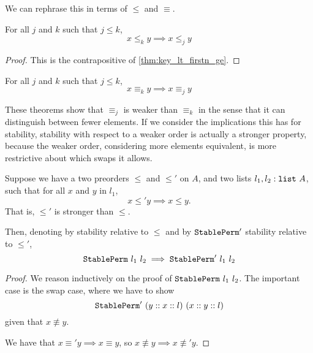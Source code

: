 \documentclass[sigplan,10pt,anonymous,review]{thesis}
\begin{document}
We can rephrase this in terms of $\le$ and $\equiv$.

\begin{corollary}
  For all $j$ and $k$ such that $j \le k$,
  \begin{equation*}
    x \le_k y \implies x \le_j y
  \end{equation*}
\end{corollary}
\begin{proof}
  This is the contrapositive of \cref{thm:key_lt_firstn_ge}.
\end{proof}

\begin{corollary}
  For all $j$ and $k$ such that $j \le k$,
  \begin{equation*}
    x \equiv_k y \implies x \equiv_j y
  \end{equation*}
\end{corollary}

These theorems show that $\equiv_j$ is weaker than $\equiv_k$ in the sense that
it can distinguish between fewer elements. If we consider the
implications this has for stability, stability with respect to a
weaker order is actually a stronger property, because the weaker
order, considering more elements equivalent, is more restrictive about
which swaps it allows.

\begin{lemma}
  \label{thm:stableperm_weaken}
  Suppose we have a two preorders $\le$ and $\le'$ on $A$, and two lists
  $l_1,l_2 : \texttt{\textup{list}}~A$, such that for all $x$ and $y$ in $l_1$,
  \begin{equation*}
    x \le' y \implies x \le y.
  \end{equation*}
  That is, $\le'$ is stronger than $\le$.

  Then, denoting by  stability relative to $\le$ and
  by $\texttt{\textup{StablePerm}}'$ stability relative to $\le'$,
  \begin{equation*}
    \texttt{\textup{StablePerm}}~l_1~l_2 \implies \texttt{\textup{StablePerm}}'~l_1~l_2
  \end{equation*}
\end{lemma}
\begin{proof}
  We reason inductively on the proof of $\texttt{\textup{StablePerm}}~l_1~l_2$.
  The important case is the swap case, where we have to show
  \begin{equation*}
    \texttt{\textup{StablePerm}}'~(y :: x :: l)~(x :: y :: l)
  \end{equation*}
  given that $x \not\equiv y$.

  We have that $x \equiv' y \implies x \equiv y$, so $x \not\equiv y \implies x
  \not\equiv' y$.
\end{proof}
\end{document}
